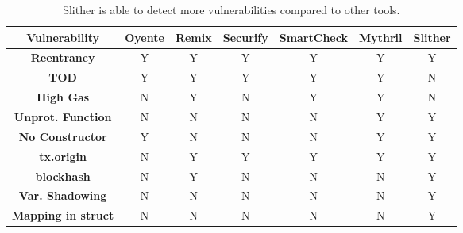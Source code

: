 \begin{table}[htb]
	\caption{Slither is able to detect more vulnerabilities compared to other tools.}
	\label{table:slither}
	\centering
	\scriptsize
	\setlength\LTleft{-1in}
	\setlength\LTright{-1in}
	\begin{tabular}{|c|c|c|c|c|c|c|}
		\hline
		\textbf{Vulnerability} & 
		\textbf{Oyente} & \textbf{Remix} & \textbf{Securify} & \textbf{SmartCheck} & \textbf{Mythril} & \textbf{Slither} \\ \hline
		\textbf{Reentrancy}        & Y & Y & Y & Y & Y & Y \\
		\textbf{TOD}               & Y & Y & Y & Y & Y & N \\
		\textbf{High Gas}          & N & Y & N & Y & Y & N \\
		\textbf{Unprot. Function}  & N & N & N & N & Y & Y \\  
		\textbf{No Constructor}    & Y & N & N & N & Y & Y \\ 
		\textbf{tx.origin}         & N & Y & Y & Y & Y & Y \\ 
		\textbf{blockhash}         & N & Y & N & N & N & Y \\
		\textbf{Var. Shadowing}    & N & N & N & N & N & Y \\ 
		\textbf{Mapping in struct} & N & N & N & N & N & Y \\ 
		\hline
	\end{tabular}
	\vspace{-2ex}
\end{table}

